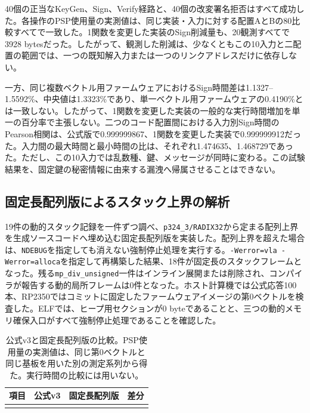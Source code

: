 \documentclass[a4paper,10pt]{ltjsarticle}
\theoremstyle{definition}
\theoremstyle{remark}
\begin{document}
40個の正当なKeyGen、Sign、Verify経路と、40個の改変署名拒否はすべて成功した。各操作のPSP使用量の実測値は、同じ実装・入力に対する配置AとBの80比較すべてで一致した。1関数を変更した実装のSign削減量も、20観測すべてで\num{3928} bytesだった。したがって、観測した削減は、少なくともこの10入力と二配置の範囲では、一つの既知解入力または一つのリンクアドレスだけに依存しない。

一方、同じ複数ベクトル用ファームウェアにおけるSign時間差は\num{1.1327}--\num{1.5592}\%、中央値は\num{1.3323}\%であり、単一ベクトル用ファームウェアの\num{0.4190}\%とは一致しない。したがって、1関数を変更した実装の一般的な実行時間増加を単一の百分率で主張しない。二つのコード配置間における入力別Sign時間のPearson相関は、公式版で\num{0.999999867}、1関数を変更した実装で\num{0.999999912}だった。入力間の最大時間と最小時間の比は、それぞれ\num{1.474635}、\num{1.468729}であった。ただし、この10入力では乱数種、鍵、メッセージが同時に変わる。この試験結果を、固定鍵の秘密情報に由来する漏洩へ帰属させることはできない。

\subsection{固定長配列版によるスタック上界の解析}

19件の動的スタック記録を一件ずつ調べ、\texttt{p324\_3/RADIX32}から定まる配列上界を生成ソースコードへ埋め込む固定長配列版を実装した。配列上界を超えた場合は、\texttt{NDEBUG}を指定しても消えない強制停止処理を実行する。\texttt{-Werror=vla -Werror=alloca}を指定して再構築した結果、18件が固定長のスタックフレームとなった。残る\texttt{mp\_div\_unsigned}一件はインライン展開または削除され、コンパイラが報告する動的局所フレームは0件となった。ホスト計算機では公式応答100本、RP2350ではコミットに固定したファームウェアイメージの第0ベクトルを検査した。ELFでは、ヒープ用セクションが0 byteであることと、三つの動的メモリ確保入口がすべて強制停止処理であることを確認した。

\begin{table}[H]
  \centering
  \caption{公式v3と固定長配列版の比較。PSP使用量の実測値は、同じ第0ベクトルと同じ基板を用いた別の測定系列から得た。実行時間の比較には用いない。}
  \label{tab:v3-fixed-frame}
  \small
  \begin{tabular}{@{}lrrr@{}}
    \toprule
    項目 & 公式v3 & 固定長配列版 & 差分 \\
    \midrule
    \\
    \bottomrule
  \end{tabular}
\end{table}
\end{document}
